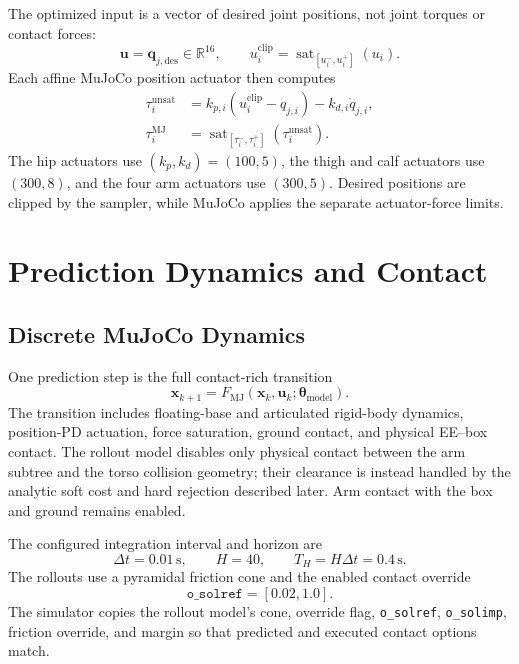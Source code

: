 \documentclass[11pt,a4paper]{article}
\newcommand{\R}{\mathbb{R}}
\newcommand{\sat}{\operatorname{sat}}
\newcommand{\code}[1]{\texttt{#1}}
\begin{document}
The optimized input is a vector of desired joint positions, not joint torques
or contact forces:
\begin{equation}
  \boxed{\bm{u}=\bm{q}_{j,\mathrm{des}}\in\R^{16}},
  \qquad
  u_i^{\mathrm{clip}}=\sat_{[u_i^-,u_i^+]}(u_i).
\end{equation}
Each affine MuJoCo position actuator then computes
\begin{align}
  \tau_i^{\mathrm{unsat}}
  &=k_{p,i}(u_i^{\mathrm{clip}}-q_{j,i})
    -k_{d,i}\dot q_{j,i},\\
  \tau_i^{\mathrm{MJ}}
  &=\sat_{[\tau_i^-,\tau_i^+]}
    \left(\tau_i^{\mathrm{unsat}}\right).
\end{align}
The hip actuators use $(k_p,k_d)=(100,5)$, the thigh and calf actuators use
$(300,8)$, and the four arm actuators use $(300,5)$. Desired positions are
clipped by the sampler, while MuJoCo applies the separate actuator-force
limits.

\section{Prediction Dynamics and Contact}

\subsection{Discrete MuJoCo Dynamics}

One prediction step is the full contact-rich transition
\begin{equation}
  \boxed{
  \bm{x}_{k+1}
  =F_{\mathrm{MJ}}(\bm{x}_k,\bm{u}_k;
                    \bm{\theta}_{\mathrm{model}}).
  }
\end{equation}
The transition includes floating-base and articulated rigid-body dynamics,
position-PD actuation, force saturation, ground contact, and physical
EE--box contact. The rollout model disables only physical contact between the
arm subtree and the torso collision geometry; their clearance is instead
handled by the analytic soft cost and hard rejection described later. Arm
contact with the box and ground remains enabled.

The configured integration interval and horizon are
\begin{equation}
  \Delta t=0.01\,\mathrm{s},\qquad H=40,\qquad
  T_H=H\Delta t=0.4\,\mathrm{s}.
\end{equation}
The rollouts use a pyramidal friction cone and the enabled contact override
\begin{equation}
  \code{o\_solref}=[0.02,1.0].
\end{equation}
The simulator copies the rollout model's cone, override flag,
\code{o\_solref}, \code{o\_solimp}, friction override, and margin so that
predicted and executed contact options match.
\end{document}
